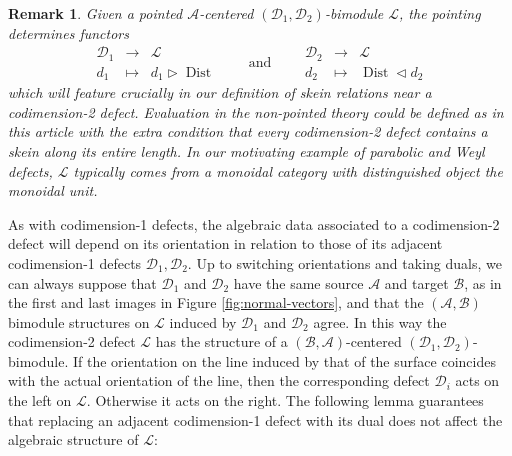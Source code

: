 \documentclass[a4paper]{article}
\numberwithin{equation}{section}
\newtheorem{remark}[counter]{Remark}
\newcommand{\1}{{\mathrm{1}\mkern-4mu{\mathchoice{}{}{\mskip-0.5mu}{\mskip-1mu}}\mathrm{l}}}
\DeclareMathOperator{\Dist}{Dist}
\newcommand{\A}{\mathcal{A}}
\newcommand{\B}{\mathcal{B}}
\newcommand{\D}{\mathcal{D}}
\renewcommand{\L}{\mathcal{L}}
\begin{document}
\begin{remark}
  Given a pointed $\A$-centered $(\D_1,\D_2)$-bimodule $\L$, the pointing determines functors
  \begin{equation}
    \begin{array}{ccc}
        \D_1 & \to & \L \\
        d_1 & \mapsto & d_1\triangleright\Dist 
    \end{array}\qquad\text{and}\qquad
    \begin{array}{ccc}
        \D_2 & \to & \L \\
        d_2 & \mapsto &  \Dist\triangleleft d_2 
    \end{array}
  \end{equation}
which will feature crucially in our definition of skein relations near a codimension-2 defect.
  Evaluation in the non-pointed theory could be defined as in this article with the extra condition that every codimension-2 defect contains a skein along its entire length.
  In our motivating example of parabolic and Weyl defects, $\L$ typically comes from a monoidal category with distinguished object the monoidal unit.
\end{remark}



As with codimension-1 defects, the algebraic data associated to a codimension-2 defect will depend on its orientation in relation to those of its adjacent codimension-1 defects $\D_1,\D_2$. Up to switching orientations and taking duals, we can always suppose that $\D_1$ and $\D_2$ have the same source $\A$ and target $\B$, as in the first and last images in Figure \ref{fig:normal-vectors}, and that the $(\A,\B)$ bimodule structures on $\L$ induced by $\D_1$ and $\D_2$ agree. In this way the codimension-2 defect $\L$ has the structure of a $(\B,\A)$-centered $(\D_1,\D_2)$-bimodule.
If the orientation on the line induced by that of the surface coincides with the actual orientation of the line, then the corresponding defect $\D_i$ acts on the left on $\L$. Otherwise it acts on the right. The following lemma guarantees that replacing an adjacent codimension-1 defect with its dual does not affect the algebraic structure of $\L$:
\end{document}

